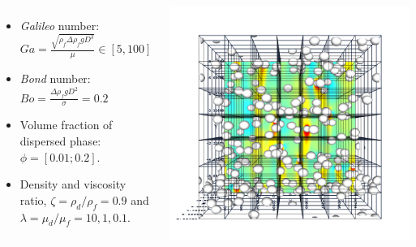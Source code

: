 \documentclass{sintefbeamer}
\begin{document}
\begin{frame}
\begin{columns}
{  \begin{itemize}
    \item \textit{Galileo} number: $Ga =\frac{\sqrt{\rho_f \Delta\rho_f gD^3}}{\mu} \in [5, 100]$
    \item \textit{Bond} number: $Bo = \frac{\Delta \rho_f g D^2}{\sigma} = 0.2$ 
    \item Volume fraction of dispersed phase: $\phi = [0.01;0.2]$. 
    \item Density and viscosity ratio, $\zeta=\rho_d/\rho_f=0.9$ and $\lambda=\mu_d/\mu_f= 10,1,0.1$. 
  \end{itemize}
  }
  \vfill
  \centering
  \href{videos/DNS.mp4}{}
  \includegraphics[width =  \textwidth]{image/PHI_01_Ga_75.png}

  \end{columns}
\end{frame}
\end{document}
